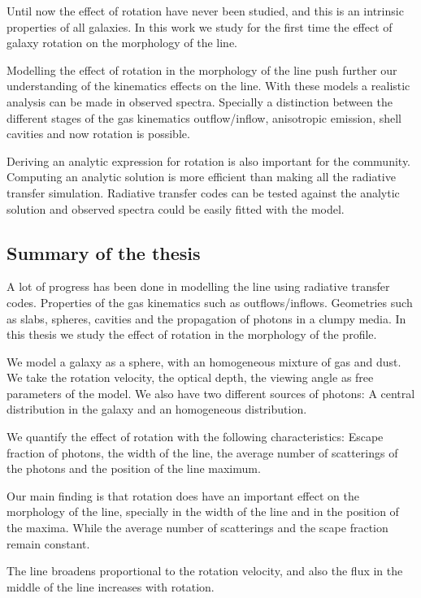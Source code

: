 Until now the effect of rotation have never been studied, and this is 
an intrinsic properties of all galaxies. In this work we study for the 
first time the effect of galaxy rotation on the morphology of the \ly line.

Modelling the effect of rotation in the morphology of the \ly line push
further our understanding of the kinematics effects on the \ly line. 
With these models a realistic analysis can be made in observed \ly spectra. 
Specially a distinction between the different stages of the gas kinematics
 outflow/inflow, anisotropic \ly emission, shell cavities and now
 rotation is possible.

Deriving an analytic expression for rotation is also important for
the community. Computing an analytic solution is more efficient than
making all the radiative transfer simulation. Radiative transfer codes
can be tested against the analytic solution and observed spectra could
be easily fitted  with the model. 

\subsection{Summary of the thesis}

A lot of progress has been done in modelling the \ly line using radiative
transfer codes. Properties of the gas kinematics such as outflows/inflows. 
Geometries such as slabs, spheres, cavities and the propagation of \ly photons
in a clumpy media. In this thesis we study the effect 
of rotation in the morphology of the \ly profile.  

We model a galaxy as a sphere, with an homogeneous mixture of gas and dust. 
We take the rotation velocity, the optical depth, the viewing angle as free
parameters of the model. We also have two different sources of \ly photons:
A central distribution in the galaxy and an homogeneous distribution. 

We quantify the effect of rotation with the following characteristics: 
Escape fraction of \ly photons, the width of the \ly line, the average number
of scatterings of the \ly photons and the position of the \ly line maximum.

Our main finding is that rotation does have an important effect on the morphology 
of the \ly line, specially in the width of the line and in the position of the 
maxima. While the average number of scatterings  and the scape
fraction remain constant.

The line broadens proportional to the rotation velocity, and also the flux in 
the middle of the line increases with rotation.

